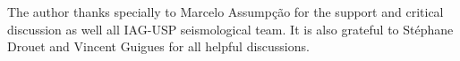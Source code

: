 \documentclass[draft, grl]{agutex}
\begin{document}
\begin{article}

%
%
%

\begin{acknowledgments}
The author thanks specially to Marcelo Assumpção for the support and critical discussion as well all IAG-USP seismological team. It is also grateful to Stéphane Drouet and Vincent Guigues for all helpful discussions.
\end{acknowledgments}







\end{article}
\end{document}
